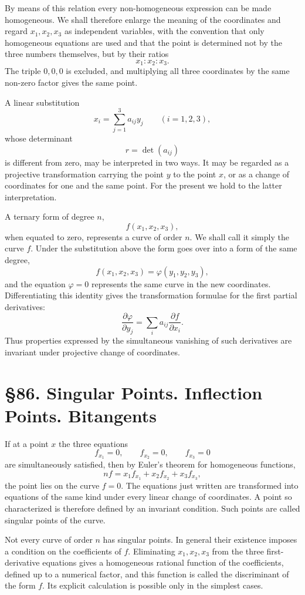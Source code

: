 \documentclass[11pt,a4paper]{book}
\newcommand{\webersection}[2]{\clearpage\section*{\S #1. #2}}
\begin{document}
By means of this relation every non-homogeneous expression can be made homogeneous.  We shall therefore enlarge the meaning of the coordinates and regard \(x_1,x_2,x_3\) as independent variables, with the convention that only homogeneous equations are used and that the point is determined not by the three numbers themselves, but by their ratios
\[
x_1:x_2:x_3.
\]
The triple \(0,0,0\) is excluded, and multiplying all three coordinates by the same non-zero factor gives the same point.

A linear substitution
\[
x_i=\sum_{j=1}^3 a_{ij}y_j\qquad (i=1,2,3),
\]
whose determinant
\[
r=\det(a_{ij})
\]
is different from zero, may be interpreted in two ways.  It may be regarded as a projective transformation carrying the point \(y\) to the point \(x\), or as a change of coordinates for one and the same point.  For the present we hold to the latter interpretation.

A ternary form of degree \(n\),
\[
f(x_1,x_2,x_3),
\]
when equated to zero, represents a curve of order \(n\).  We shall call it simply the curve \(f\).  Under the substitution above the form goes over into a form of the same degree,
\[
f(x_1,x_2,x_3)=\varphi(y_1,y_2,y_3),
\]
and the equation \(\varphi=0\) represents the same curve in the new coordinates.  Differentiating this identity gives the transformation formulae for the first partial derivatives:
\[
\frac{\partial\varphi}{\partial y_j}
  =\sum_i a_{ij}\frac{\partial f}{\partial x_i}.
\]
Thus properties expressed by the simultaneous vanishing of such derivatives are invariant under projective change of coordinates.

\webersection{86}{Singular Points. Inflection Points. Bitangents}

If at a point \(x\) the three equations
\[
f_{x_1}=0,\qquad f_{x_2}=0,\qquad f_{x_3}=0
\]
are simultaneously satisfied, then by Euler's theorem for homogeneous functions,
\[
nf=x_1f_{x_1}+x_2f_{x_2}+x_3f_{x_3},
\]
the point lies on the curve \(f=0\).  The equations just written are transformed into equations of the same kind under every linear change of coordinates.  A point so characterized is therefore defined by an invariant condition.  Such points are called singular points of the curve.

Not every curve of order \(n\) has singular points.  In general their existence imposes a condition on the coefficients of \(f\).  Eliminating \(x_1,x_2,x_3\) from the three first-derivative equations gives a homogeneous rational function of the coefficients, defined up to a numerical factor, and this function is called the discriminant of the form \(f\).  Its explicit calculation is possible only in the simplest cases.
\end{document}
